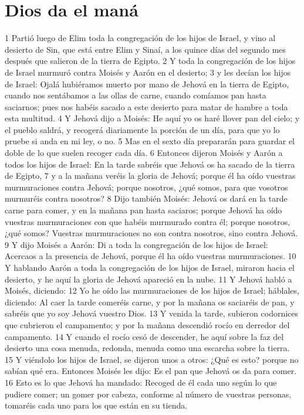 \section{Dios da el maná}
1 Partió luego de Elim toda la congregación de los hijos de Israel, y vino al desierto de Sin, que está entre Elim y Sinaí, a los quince días del segundo mes después que salieron de la tierra de Egipto.
2 Y toda la congregación de los hijos de Israel murmuró contra Moisés y Aarón en el desierto;
3 y les decían los hijos de Israel: Ojalá hubiéramos muerto por mano de Jehová en la tierra de Egipto, cuando nos sentábamos a las ollas de carne, cuando comíamos pan hasta saciarnos; pues nos habéis sacado a este desierto para matar de hambre a toda esta multitud.
4 Y Jehová dijo a Moisés: He aquí yo os haré llover pan del cielo; y el pueblo saldrá, y recogerá diariamente la porción de un día, para que yo lo pruebe si anda en mi ley, o no.
5 Mas en el sexto día prepararán para guardar el doble de lo que suelen recoger cada día.
6 Entonces dijeron Moisés y Aarón a todos los hijos de Israel: En la tarde sabréis que Jehová os ha sacado de la tierra de Egipto,
7 y a la mañana veréis la gloria de Jehová; porque él ha oído vuestras murmuraciones contra Jehová; porque nosotros, ¿qué somos, para que vosotros murmuréis contra nosotros?
8 Dijo también Moisés: Jehová os dará en la tarde carne para comer, y en la mañana pan hasta saciaros; porque Jehová ha oído vuestras murmuraciones con que habéis murmurado contra él; porque nosotros, ¿qué somos? Vuestras murmuraciones no son contra nosotros, sino contra Jehová.
9 Y dijo Moisés a Aarón: Di a toda la congregación de los hijos de Israel: Acercaos a la presencia de Jehová, porque él ha oído vuestras murmuraciones.
10 Y hablando Aarón a toda la congregación de los hijos de Israel, miraron hacia el desierto, y he aquí la gloria de Jehová apareció en la nube.
11 Y Jehová habló a Moisés, diciendo:
12 Yo he oído las murmuraciones de los hijos de Israel; háblales, diciendo: Al caer la tarde comeréis carne, y por la mañana os saciaréis de pan, y sabréis que yo soy Jehová vuestro Dios.
13 Y venida la tarde, subieron codornices que cubrieron el campamento; y por la mañana descendió rocío en derredor del campamento.
14 Y cuando el rocío cesó de descender, he aquí sobre la faz del desierto una cosa menuda, redonda, menuda como una escarcha sobre la tierra.
15 Y viéndolo los hijos de Israel, se dijeron unos a otros: ¿Qué es esto? porque no sabían qué era. Entonces Moisés les dijo: Es el pan que Jehová os da para comer.
16 Esto es lo que Jehová ha mandado: Recoged de él cada uno según lo que pudiere comer; un gomer por cabeza, conforme al número de vuestras personas, tomaréis cada uno para los que están en su tienda.
